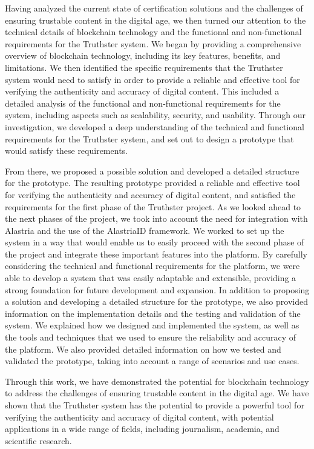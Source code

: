 \documentclass[target=mst,aauheader=]{thud}
\begin{document}
Having analyzed the current state of certification solutions and the challenges of ensuring trustable content in the digital age, we then turned our attention to the technical details of blockchain technology and the functional and non-functional requirements for the Truthster system. We began by providing a comprehensive overview of blockchain technology, including its key features, benefits, and limitations. We then identified the specific requirements that the Truthster system would need to satisfy in order to provide a reliable and effective tool for verifying the authenticity and accuracy of digital content. This included a detailed analysis of the functional and non-functional requirements for the system, including aspects such as scalability, security, and usability. Through our investigation, we developed a deep understanding of the technical and functional requirements for the Truthster system, and set out to design a prototype that would satisfy these requirements.


From there, we proposed a possible solution and developed a detailed structure for the prototype. The resulting prototype provided a reliable and effective tool for verifying the authenticity and accuracy of digital content, and satisfied the requirements for the first phase of the Truthster project. As we looked ahead to the next phases of the project, we took into account the need for integration with Alastria and the use of the AlastriaID framework. We worked to set up the system in a way that would enable us to easily proceed with the second phase of the project and integrate these important features into the platform. By carefully considering the technical and functional requirements for the platform, we were able to develop a system that was easily adaptable and extensible, providing a strong foundation for future development and expansion.
In addition to proposing a solution and developing a detailed structure for the prototype, we also provided information on the implementation details and the testing and validation of the system. We explained how we designed and implemented the system, as well as the tools and techniques that we used to ensure the reliability and accuracy of the platform. We also provided detailed information on how we tested and validated the prototype, taking into account a range of scenarios and use cases.


Through this work, we have demonstrated the potential for blockchain technology to address the challenges of ensuring trustable content in the digital age. We have shown that the Truthster system has the potential to provide a powerful tool for verifying the authenticity and accuracy of digital content, with potential applications in a wide range of fields, including journalism, academia, and scientific research.
\end{document}
